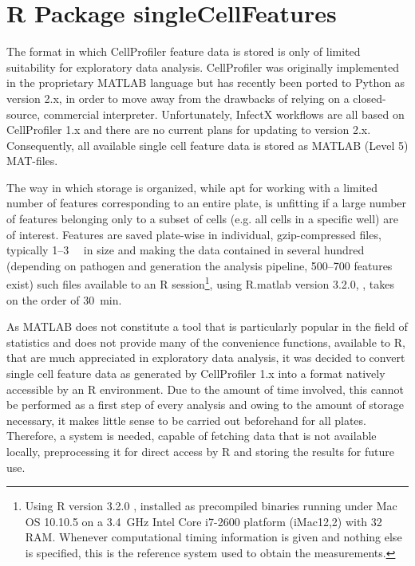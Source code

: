 \chapter{R Package singleCellFeatures}
\label{ch:singlecellfeatures}

The format in which CellProfiler feature data is stored is only of limited suitability for exploratory data analysis. CellProfiler was originally implemented in the proprietary MATLAB language but has recently been ported to Python as version 2.x, in order to move away from the drawbacks of relying on a closed-source, commercial interpreter. Unfortunately, InfectX workflows are all based on CellProfiler 1.x and there are no current plans for updating to version 2.x. Consequently, all available single cell feature data is stored as MATLAB (Level 5) MAT-files.

The way in which storage is organized, while apt for working with a limited number of features corresponding to an entire plate, is unfitting if a large number of features belonging only to a subset of cells (e.g. all cells in a specific well) are of interest. Features are saved plate-wise in individual, gzip-compressed files, typically 1--\SI{3}{\mega\byte} in size and making the data contained in several hundred (depending on pathogen and generation the analysis pipeline, 500--700 features exist) such files available to an R session\footnote{Using R version 3.2.0 \citep{RCoreTeam2015}, installed as precompiled binaries running under Mac OS 10.10.5 on a \SI{3.4}{\giga\hertz} Intel Core i7-2600 platform (iMac12,2) with \SI{32}{\giga\byte} RAM. Whenever computational timing information is given and nothing else is specified, this is the reference system used to obtain the measurements.}, using R.matlab version 3.2.0, \citet{Bengtsson2015}, takes on the order of \SI{30}{\minute}.

As MATLAB does not constitute a tool that is particularly popular in the field of statistics and does not provide many of the convenience functions, available to R, that are much appreciated in exploratory data analysis, it was decided to convert single cell feature data as generated by CellProfiler 1.x into a format natively accessible by an R environment. Due to the amount of time involved, this cannot be performed as a first step of every analysis and owing to the amount of storage necessary, it makes little sense to be carried out beforehand for all plates. Therefore, a system is needed, capable of fetching data that is not available locally, preprocessing it for direct access by R and storing the results for future use.

